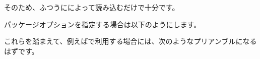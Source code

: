 \documentclass[../otf-unofficial-guide]{subfiles}
\begin{document}
そのため、ふつうにによって読み込むだけで十分です。

\begin{texsource}
\usepackage{otf}
\end{texsource}

パッケージオプションを指定する場合は以下のようにします。

\begin{texsource}
\usepackage[uplatex, deluxe, jis2004]{otf}
\end{texsource}

これらを踏まえて、例えば{\upLaTeXdvipdfmx}で利用する場合には、次のようなプリアンブルになるはずです。

\end{document}

